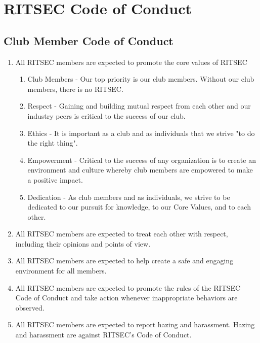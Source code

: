 
\section{RITSEC Code of Conduct}

\subsection{Club Member Code of Conduct}

\begin{enumerate}
  \item All RITSEC members are expected to promote the core values of RITSEC
  \begin{enumerate}
    \item Club Members - Our top priority is our club members. Without our club
      members, there is no RITSEC.
    \item Respect - Gaining and building mutual respect from each other and our
      industry peers is critical to the success of our club.
    \item Ethics - It is important as a club and as individuals that we strive
      "to do the right thing".
    \item Empowerment - Critical to the success of any organization is to
      create an environment and culture whereby club members are empowered to
      make a positive impact.
    \item Dedication - As club members and as individuals, we strive to be
      dedicated to our pursuit for knowledge, to our Core Values, and to each
      other.
  \end{enumerate}
  \item All RITSEC members are expected to treat each other with respect,
    including their opinions and points of view.
  \item All RITSEC members are expected to help create a safe and engaging
    environment for all members.
  \item All RITSEC members are expected to promote the rules of the RITSEC Code
    of Conduct and take action whenever inappropriate behaviors are observed.
  \item All RITSEC members are expected to report hazing and harassment. Hazing
    and harassment are against RITSEC’s Code of Conduct.
\end{enumerate}

